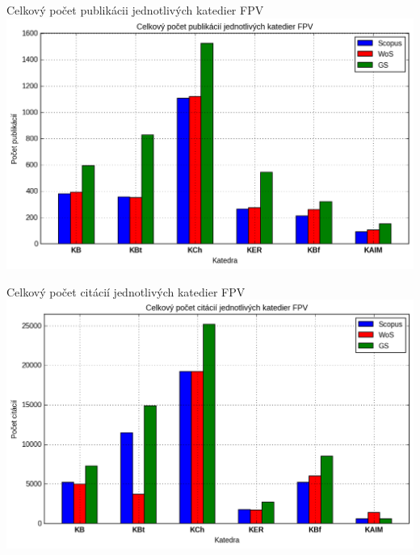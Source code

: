 \documentclass{beamer}
\begin{document}
%
%
\begin{frame}{Celkový počet publikácii jednotlivých katedier FPV}
  \includegraphics[scale=0.5]{plot-results-data-papers.png}
\end{frame}

%
%
\begin{frame}{Celkový počet citácií jednotlivých katedier FPV}
  \includegraphics[scale=0.5]{plot-results-data-citations.png}
\end{frame}
\end{document}
